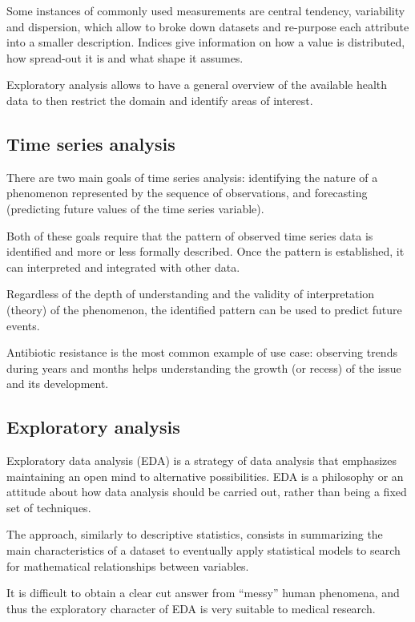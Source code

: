 Some instances of commonly used measurements are central tendency, variability and dispersion, which allow to broke down datasets and re-purpose each attribute into a smaller description. Indices give information on how a value is distributed, how spread-out it is and what shape it assumes. 

Exploratory analysis allows to have a general overview of the available health data to then restrict the domain and identify areas of interest.

\subsection{Time series analysis}
There are two main goals of time series analysis: identifying the nature of a phenomenon represented by the sequence of observations, and forecasting (predicting future values of the time series variable). 

Both of these goals require that the pattern of observed time series data is identified and more or less formally described. Once the pattern is established, it can interpreted and integrated with other data. 

Regardless of the depth of understanding and the validity of interpretation (theory) of the phenomenon, the identified pattern can be used to predict future events\cite{timeseries}.

Antibiotic resistance is the most common example of use case: observing trends during years and months helps understanding the growth (or recess) of the issue and its development.

\subsection{Exploratory analysis}
Exploratory data analysis (EDA) is a strategy of data analysis that emphasizes maintaining an open mind to alternative possibilities. EDA is a philosophy or an attitude about how data analysis should be carried out, rather than being a fixed set of techniques\cite{yu}.

The approach, similarly to descriptive statistics, consists in summarizing the main characteristics of a dataset to eventually apply statistical models to search for mathematical relationships between variables.

It is difficult to obtain a clear­ cut answer from “messy” human phenomena, and thus the exploratory character of EDA is very suitable to medical research.

